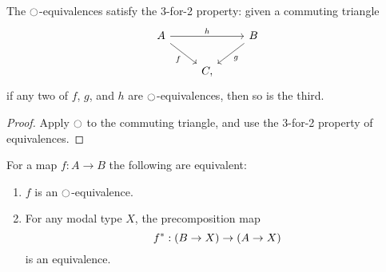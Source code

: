 \begin{lem}\label{lem:3for2_mequiv}
The ${\ocircle}$-equivalences satisfy the 3-for-2 property: given a commuting triangle
\begin{equation*}
\begin{tikzcd}
A \arrow[rr,"h"] \arrow[dr,swap,"f"] & & B \arrow[dl,"g"] \\
& C,
\end{tikzcd}
\end{equation*}
if any two of $f$, $g$, and $h$ are ${\ocircle}$-equivalences, then so is the third.
\end{lem}

\begin{proof}
Apply ${\ocircle}$ to the commuting triangle, and use the 3-for-2 property of equivalences.
\end{proof}

\begin{lem}\label{lem:modal_equivalence}
For a map $f : A \to B$ the following are equivalent:
\begin{enumerate}
\item $f$ is an ${\ocircle}$-equivalence.
\item For any modal type $X$, the precomposition map
\begin{equation*}
{f}^\ast : (B \to X) \to (A \to X)
\end{equation*}
is an equivalence.
\end{enumerate}
\end{lem}

